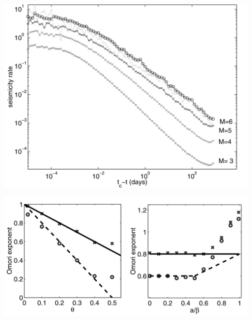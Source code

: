\documentclass[aspectratio=43,9pt]{beamer}
\begin{document}
\begin{frame}
 {}
 
 \begin{minipage}{0.48\linewidth}
   \includegraphics[width=1\linewidth]{Figs/fig5}
 \end{minipage}
 \begin{minipage}{0.48\linewidth}

 \end{minipage}

 
\end{frame}



\begin{frame}
 {}
 
 \begin{minipage}{0.48\linewidth}
   \includegraphics[width=1\linewidth]{Figs/fig6}
 \end{minipage}
 \begin{minipage}{0.48\linewidth}

 \end{minipage}

 
\end{frame}
\end{document}
